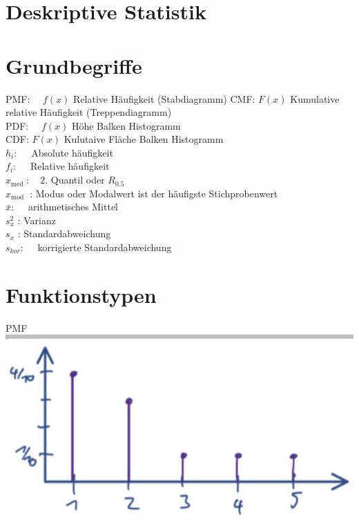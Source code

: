 \documentclass[10pt]{article}
\begin{document}
\section*{Deskriptive Statistik}
\section*{Grundbegriffe}
PMF: $\quad f(x)$ Relative Häufigkeit (Stabdiagramm) CMF: $F(x)$ Kumulative relative Häufigkeit (Treppendiagramm)\\
PDF: $\quad f(x)$ Höhe Balken Histogramm\\
CDF: $F(x)$ Kulutaive Fläche Balken Histogramm\\
$h_{i}: \quad$ Absolute häufigkeit\\
$f_{i}: \quad$ Relative häufigkeit\\
$x_{\text {med }}: \quad 2$. Quantil oder $R_{0.5}$\\
$x_{\text {mod }}$ : Modus oder Modalwert ist der häufigste Stichprobenwert\\
$\bar{x}: \quad$ arithmetisches Mittel\\
$s_{x}^{2}$ : Varianz\\
$s_{x}$ : Standardabweichung\\
$s_{k o r}: \quad$ korrigierte Standardabweichung

\section*{Funktionstypen}
PMF\\
\includegraphics[width=\linewidth]{images/2024_12_29_0906b02acf849bda8665g-1(1)}
\end{document}
